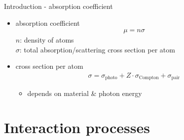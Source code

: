 \documentclass[11pt,xcolor=dvipsnames,professionalfonts,notes]{beamer}
\begin{document}


\begin{frame}{Introduction - absorption coefficient}
	\begin{itemize}
		\setlength\itemsep{2.em}
		\item absorption coefficient
		\begin{align*}
			\mu = n \sigma
		\end{align*}
		$n$: density of atoms \\
		$\sigma$: total absorption/scattering cross section per atom
		
		\item cross section per atom
		\begin{align*}
			\sigma = \sigma_\mathrm{photo} + Z \cdot \sigma_\mathrm{Compton} + \sigma_\mathrm{pair}
		\end{align*}
		\begin{itemize}
			\item depends on material \& photon energy
		\end{itemize}
		
		
		
		

		
	\end{itemize}	
\end{frame}


\section{Interaction processes}
\end{document}
